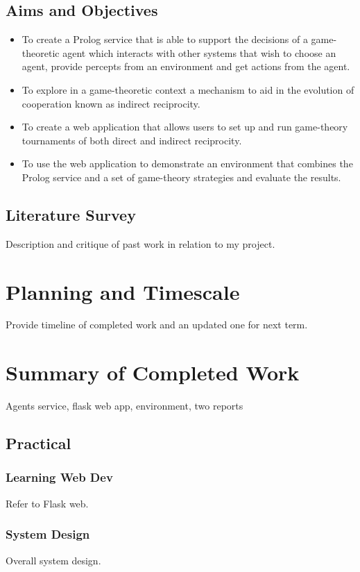 \documentclass[]{final_report}
\begin{document}
\section{Aims and Objectives}
\begin{itemize}
\item To create a Prolog service that is able to support the decisions of a game-theoretic agent which interacts with other systems that wish to choose an agent, provide percepts from an environment and get actions from the agent.
\item To explore in a game-theoretic context a mechanism to aid in the evolution of cooperation known as indirect reciprocity.
\item To create a web application that allows users to set up and run game-theory tournaments of both direct and indirect reciprocity.
\item To use the web application to demonstrate an environment that combines the Prolog service and a set of game-theory strategies and evaluate the results.
\end{itemize}

\section{Literature Survey}
Description and critique of past work in relation to my project.

\chapter{Planning and Timescale}
Provide timeline of completed work and an updated one for next term.

\chapter{Summary of Completed Work}
Agents service, flask web app, environment, two reports

\section{Practical}

\subsection{Learning Web Dev}
Refer to Flask web.

\subsection{System Design}
Overall system design.
\end{document}
